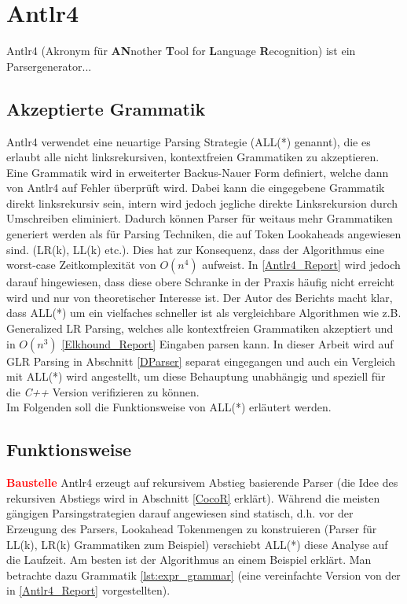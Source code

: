 \section{Antlr4}
Antlr4 (Akronym für \textbf{AN}nother \textbf{T}ool for \textbf{L}anguage \textbf{R}ecognition)
ist ein Parsergenerator...
\subsection{Akzeptierte Grammatik}
Antlr4 verwendet eine neuartige Parsing Strategie (ALL(*) genannt), die es erlaubt alle nicht linksrekursiven, kontextfreien Grammatiken zu akzeptieren.
Eine Grammatik wird in erweiterter Backus-Nauer Form definiert, welche dann von Antlr4 auf Fehler überprüft wird. Dabei kann die eingegebene Grammatik direkt linksrekursiv sein,
intern wird jedoch jegliche direkte Linksrekursion durch Umschreiben eliminiert. Dadurch können Parser für weitaus mehr Grammatiken generiert werden als für Parsing Techniken, 
die auf Token Lookaheads angewiesen sind. (LR(k), LL(k) etc.). Dies hat zur Konsequenz, dass der Algorithmus eine worst-case Zeitkomplexität von $O(n^4)$ aufweist. 
In \ref{Antlr4_Report} wird jedoch darauf hingewiesen, dass diese obere Schranke in der Praxis häufig nicht erreicht wird und nur von theoretischer Interesse ist. 
Der Autor des Berichts macht klar, dass ALL(*) um ein vielfaches schneller ist als vergleichbare Algorithmen wie z.B. Generalized LR Parsing, welches alle kontextfreien
Grammatiken akzeptiert und in $O(n^3)$ \ref{Elkhound_Report} Eingaben parsen kann. In dieser Arbeit wird auf GLR Parsing in Abschnitt \ref{DParser} separat eingegangen und auch 
ein Vergleich mit ALL(*) wird angestellt, um diese Behauptung unabhängig und speziell für die \textit{C++} Version verifizieren zu können.\\
Im Folgenden soll die Funktionsweise von ALL(*) erläutert werden. 
\subsection{Funktionsweise}
\textcolor{red}{\textbf{Baustelle}}
Antlr4 erzeugt auf rekursivem Abstieg basierende Parser (die Idee des rekursiven Abstiegs wird in Abschnitt \ref{CocoR} erklärt). Während die meisten gängigen Parsingstrategien darauf angewiesen sind
statisch, d.h. vor der Erzeugung des Parsers, Lookahead Tokenmengen zu konstruieren (Parser für LL(k), LR(k) Grammatiken zum Beispiel) verschiebt ALL(*) diese Analyse auf die Laufzeit. 
Am besten ist der Algorithmus an einem Beispiel erklärt. 
Man betrachte dazu Grammatik \ref{lst:expr_grammar} (eine vereinfachte Version von der in \ref{Antlr4_Report} vorgestellten). 

